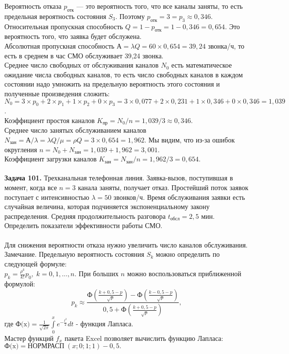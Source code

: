\documentclass{article}
\begin{document}
Вероятность отказа $p_{\text{отк}}$ — это вероятность того, что все каналы заняты,  то  есть  предельная  вероятность состояния  $S_3$.  Поэтому $p_{\text{отк}} = 3 = p_3 \approx 0,346$. \\ 
\indent
Относительная пропускная способность $Q = 1 - p_{\text{отк}} = 1 - 0,346 = 0,654$. Это вероятность того, что заявка будет обслужена. \\ \indent 
Абсолютная  пропускная способность $А = \lambda Q = 60\times0,654 =  39,24$ звонка/ч, то есть в среднем в час СМО обслуживает 39,24 звонка. \\ \indent 
Среднее число свободных от обслуживания каналов $N_0$ есть математическое ожидание числа свободных  каналов,  то есть число свободных каналов в каждом состоянии  надо умножить на предельную вероятность  этого  состояния  и  полученные  произведения  сложить: $N_0 = 3\times p_0 + 2\times p_1 + 1 \times p_2 + 0 \times p_3 = 3 \times 0,077 + 2 \times 0,231 + 1 \times 0,346 + 0\times 0,346 = 1,039 $. \\ \indent
Коэффициент простоя каналов $K_{\text{пр}} = N_0/n = 1,039/3 \approx 0,346$. \\ \indent
Среднее  число  занятых  обслуживанием  каналов $N_{\text{зан}} = А/\lambda = \lambda Q/\mu = \rho Q = 3\times0,654 = 1,962$. Мы видим, что из-за ошибок округления $n = N_0 + N_{\text{зан}} = 1,039 + 1,962 = 3,001$. \\ \indent 
Коэффициент загрузки каналов $K_{\text{зан}} = N_{\text{зан}}/n = 1,962/3 = 0,654.$
\\ \\ 
\indent \textbf{Задача 101.} 
Трехканальная телефонная линия.  Заявка-вызов, поступившая в момент, когда все $n = 3$ канала заняты, получает отказ. Простейший поток заявок поступает с интенсивностью $\lambda = 50$ звонков/ч. Время обслуживания заявки есть случайная величина, которая подчиняется  экспоненциальному  закону  распределения.  Средняя продолжительность разговора $t_{\text{обсл}} = 2,5$ мин. Определить показатели эффективности работы СМО. \\ \\ 
\noindent
Для  снижения  вероятности отказа  нужно увеличить число  каналов обслуживания. 
\\ \indent
Замечание.  Предельную вероятность состояния $S_k$ можно определить по следующей формуле: \\  $p_k = \frac{\rho^k}{k!}p_0, \; k=0, 1, ..., n$. При больших $n$ можно воспользоваться приближенной формулой: 
\[
p_k \approx \frac{\text{Ф}\left(\frac{k + 0,5 - p}{\sqrt{p}} \right) - \text{Ф}\left(\frac{k - 0,5 - p}{\sqrt{p}} \right)}{0,5 + \text{Ф}\left(\frac{k + 0,5 - p}{\sqrt{p}} \right)},
\]
где $\text{Ф(x)} = \frac{1}{\sqrt{2\pi}} \int\limits_0^x e^{-\frac{t^2}{2}}dt$ - функция Лапласа. \\ 
\indent Мастер функций $f_x$ пакета  Excel  позволяет  вычислить функцию Лапласа:\\
$\text{Ф(x)} = \text{НОРМРАСП} \; (x; 0; 1; 1) - 0,5.$
\end{document}
